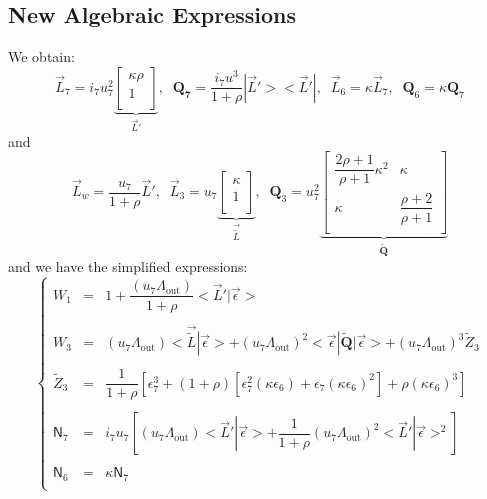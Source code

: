 \documentclass[aps,onecolumn,11pt]{revtex4}
\newcommand{\myout}[1]{{#1}_{\mathrm{out}}}
\newcommand{\mymat}[1]{{\bm{#1}}}
\newcommand{\LiAll}{\Lambda}
\newcommand{\LiAllOut}{\myout{\LiAll}}
\begin{document}
\subsection{New Algebraic Expressions}
We obtain:
\begin{equation}
\vec{L}_7 = i_7 u_7^2 
\underbrace{
\begin{bmatrix}
	\kappa \rho \\
	1\\
\end{bmatrix}}_{\vec{L}'} ,\;\;
\mymat{Q_7} = \dfrac{i_7u^3}{1+\rho} |\vec{L}'><\vec{L}'|,\;\; \vec{L}_6 = \kappa \vec{L}_7, \;\; \mymat{Q}_6 = \kappa \mymat{Q}_7
\end{equation}
and
\begin{equation}
	\vec{L}_w = \dfrac{u_7}{1+\rho} \vec{L}',\;\;
	\vec{L}_3 = u_7 \underbrace{\begin{bmatrix} \kappa \\ 1 \\ \end{bmatrix}}_{\vec{\tilde{L}}},\;\;
	\mymat{Q}_3 = u_7^2
	\underbrace{ 
	\begin{bmatrix}
	\dfrac{2\rho+1}{\rho+1} \kappa^2 & \kappa \\
	\kappa & \dfrac{\rho+2}{\rho+1}\\
	\end{bmatrix}
	}_{\mymat{\tilde{Q}}}
\end{equation}
and we have the simplified expressions:
\begin{equation}
\left\lbrace
\begin{array}{rcl}
W_1 & = & 1 + \dfrac{\left(u_7\LiAllOut\right)}{1+\rho} <\vec{L}'|\vec{\epsilon}>\\
\\
W_3 & = & \left(u_7\LiAllOut\right) <\vec{\tilde{L}}|\vec{\epsilon}> + \left(u_7\LiAllOut\right)^2 <\vec{\epsilon}|\mymat{\tilde{Q}}|\vec{\epsilon}> + \left(u_7\LiAllOut\right)^3 \tilde{Z}_3\\
\\
\tilde{Z}_3 & = & \dfrac{1}{1+\rho} \left[ \epsilon_7^3 + (1+\rho) \left[ \epsilon_7^2\left(\kappa\epsilon_6\right) +  \epsilon_7\left(\kappa\epsilon_6\right)^2 \right]+ \rho \left(\kappa \epsilon_6\right)^3\right] \\
\\
\mathsf{N}_7 & = & i_7 u_7  \left[ \left(u_7\LiAllOut\right) <\vec{L}'|\vec{\epsilon}> + \dfrac{1}{1+\rho} \left(u_7\LiAllOut\right)^2 <\vec{L}'|\vec{\epsilon}>^2 \right]\\
\\
\mathsf{N}_6 & = & \kappa \mathsf{N}_7\\
\end{array}
\right.
\end{equation}
\end{document}
